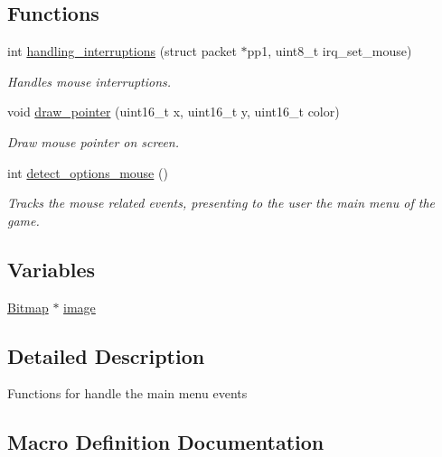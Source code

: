 \subsection*{Functions}
\begin{DoxyCompactItemize}
\item 
int \mbox{\hyperlink{group__main__menu_gae70e892130949697cbf1d294be0adf55}{handling\+\_\+interruptions}} (struct packet $\ast$pp1, uint8\+\_\+t irq\+\_\+set\+\_\+mouse)
\begin{DoxyCompactList}\small\item\em Handles mouse interruptions. \end{DoxyCompactList}\item 
void \mbox{\hyperlink{group__main__menu_ga583b8136014872071b0373049b6fde3c}{draw\+\_\+pointer}} (uint16\+\_\+t x, uint16\+\_\+t y, uint16\+\_\+t color)
\begin{DoxyCompactList}\small\item\em Draw mouse pointer on screen. \end{DoxyCompactList}\item 
int \mbox{\hyperlink{group__main__menu_gadf0b351e14ba0cb60a8d69e8b4423e68}{detect\+\_\+options\+\_\+mouse}} ()
\begin{DoxyCompactList}\small\item\em Tracks the mouse related events, presenting to the user the main menu of the game. \end{DoxyCompactList}\end{DoxyCompactItemize}
\subsection*{Variables}
\begin{DoxyCompactItemize}
\item 
\mbox{\hyperlink{struct_bitmap}{Bitmap}} $\ast$ \mbox{\hyperlink{group__main__menu_ga801bef0ab9d72c95bc5d6d6a0d8f2db0}{image}}
\end{DoxyCompactItemize}


\subsection{Detailed Description}
Functions for handle the main menu events 

\subsection{Macro Definition Documentation}
\mbox{\label{group__main__menu_ga28017dea6f5becdb38eba6eac6f51bbc}} 
